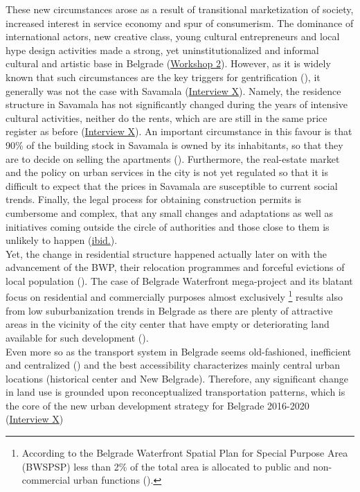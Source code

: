 \documentclass[11pt]{report}
\begin{document}
These new circumstances arose as a result of transitional marketization of society, increased interest in service economy and spur of consumerism.
The dominance of international actors, new creative class, young cultural entrepreneurs and local hype design activities made a strong, yet uninstitutionalized and informal cultural and artistic base in Belgrade (\href{PHD Workshop}{Workshop 2}).
However, as it is widely known that such circumstances are the key triggers for gentrification (\href{ref}{\citealt{krusche_gentrification_2015}}),
it generally was not the case with Savamala (\href{InterviewX}{Interview X}).
Namely, the residence structure in Savamala has not significantly changed during the years of intensive cultural activities, neither do the rents, which are are still in the same price register as before (\href{InterviewX}{Interview X}).
An important circumstance in this favour is that 90\% of the building stock in Savamala is owned by its inhabitants, so that they are to decide on selling the apartments (\href{ref}{\citealt{krusche_role_2015}}).
Furthermore, the real-estate market and the policy on urban services in the city is not yet regulated so that it is difficult to expect that the prices in Savamala are susceptible to current social trends.
Finally, the legal process for obtaining construction permits is cumbersome and complex, that any small changes and adaptations as well as initiatives coming outside the circle of authorities and those close to them is unlikely to happen (\href{Klaus}{ibid.}).
\\

Yet, the change in residential structure happened actually later on with the advancement of the BWP, their relocation programmes and forceful evictions of local population (\cite{ref media}).
The case of Belgrade Waterfront mega-project and its blatant focus on residential and commercially purposes almost exclusively
\footnote{According to the Belgrade Waterfront Spatial Plan for Special Purpose Area (BWSPSP) less than 2\% of the total area is allocated to public and non-commercial urban functions (\cite{BWPSPSP}).}
results also from low suburbanization trends in Belgrade as there are plenty of attractive areas in the vicinity of the city center that have empty or deteriorating land available for such development (\href{ref}{\citealt{hirt_belgrade_2009}}).
\\

Even more so as the transport system in Belgrade seems old-fashioned, inefficient and centralized (\href{ref}{\citealt{grozdanic_belgrade_2008}}) and the best accessibility characterizes mainly central urban locations (historical center and New Belgrade).
Therefore, any significant change in land use is grounded upon reconceptualized transportation patterns, which is the core of the new urban development strategy for Belgrade 2016-2020 (\href{InterviewX}{Interview X})
\\
\end{document}
